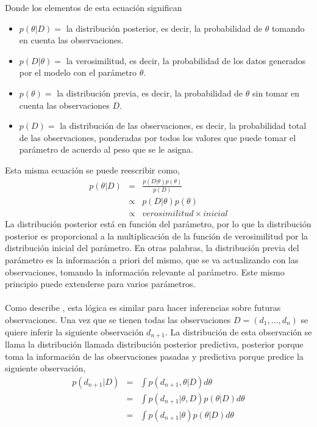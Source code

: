 Donde los elementos de esta ecuaci\'on significan
\begin{itemize}
\item $p(\theta|D)=$ la distribuci\'on posterior, es decir, la probabilidad de $\theta$ tomando en cuenta las observaciones.
\item $p(D|\theta)=$ la verosimilitud, es decir, la probabilidad de los datos generados por el modelo con el par\'ametro $\theta$.
\item $p(\theta)=$ la distribuci\'on previa, es decir, la probabilidad de $\theta$ sin tomar en cuenta las observaciones $D$.
\item $p(D)=$ la distribuci\'on de las observaciones, es decir, la probabilidad total de las observaciones, ponderadas por todos los valores que puede tomar el par\'ametro de acuerdo al peso que se le asigna.
\end{itemize}
Esta misma ecuaci\'on se puede reescribir como,
\begin{eqnarray*}
p(\theta|D)&=&\frac{p(D|\theta)p(\theta)}{p(D)}\\
		   &\propto & p(D|\theta)p(\theta)\\
		   &\propto & verosimilitud \times inicial
\end{eqnarray*}
La distribuci\'on posterior est\'a en funci\'on del par\'ametro, por lo que la distribuci\'on posterior es proporcional a la multiplicaci\'on de la funci\'on de verosimilitud por la distribuci\'on inicial del par\'ametro. En otras palabras, la distribuci\'on previa del par\'ametro es la informaci\'on a priori del mismo, que se va actualizando con las observaciones, tomando la informaci\'on relevante al par\'ametro. Este mismo principio puede extenderse para varios par\'ametros.\\
\\
Como describe \cite{gelman2014bayesian}, esta l\'ogica es similar para hacer inferencias sobre futuras observaciones. Una vez que se tienen todas las observaciones $D=(d_1,...,d_n)$ se quiere inferir la siguiente observaci\'on $d_{n+1}$. La distribuci\'on de esta observaci\'on se llama la distribuci\'on llamada distribuci\'on posterior predictiva, posterior porque toma la informaci\'on de las observaciones pasadas y predictiva porque predice la siguiente observaci\'on,
\begin{eqnarray*}
p(d_{n+1}|D)&=&\int p(d_{n+1},\theta|D) d\theta \\
			&=& \int p(d_{n+1}|\theta,D)p(\theta|D)d\theta \\
			&=& \int p(d_{n+1}|\theta)p(\theta|D)d\theta
\end{eqnarray*}
